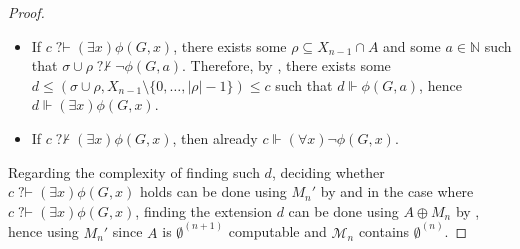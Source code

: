 \documentclass{article}
\def\NN{\mathbb{N}}
\def\PP{\mathbb{P}}
\def\F{\mathcal{F}}
\def\U{\mathcal{U}}
\def\M{\mathcal{M}}
\def\PP{\mathbb{P}}
\newcommand{\qvdash}{\operatorname{{?}{\vdash}}}
\newcommand{\nqvdash}{\operatorname{{?}{\nvdash}}}
\numberwithin{theorem}{section}
\newtheorem{proposition}[theorem]{Proposition}
\theoremstyle{definition}
\newtheorem{definition}[theorem]{Definition}
\begin{document}
\begin{proof}\ 
\begin{itemize}
\item If $c \qvdash (\exists x) \phi(G,x)$, there exists some $\rho \subseteq X_{n-1} \cap A$ and some $a \in \NN$ such that $\sigma \cup \rho \nqvdash \neg \phi(G,a)$. Therefore, by , there exists some $d \leq (\sigma \cup \rho, X_{n-1} \setminus \{0, \dots, |\rho|-1\}) \leq c$ such that $d \Vdash \phi(G,a)$, hence $d \Vdash (\exists x)\phi(G,x)$.

\item If $c \nqvdash (\exists x) \phi(G,x)$, then already $c \Vdash (\forall x) \neg \phi(G,x)$. \\

\end{itemize}
Regarding the complexity of finding such $d$, deciding whether $c \qvdash (\exists x) \phi(G,x)$ holds can be done using $M_n'$ by  and in the case where $c \qvdash (\exists x) \phi(G,x)$, finding the extension $d$ can be done using $A \oplus M_n$ by , hence using $M_n'$ since $A$ is $\emptyset^{(n+1)}$ computable and $\M_n$ contains $\emptyset^{(n)}$.

\end{proof}




\end{document}
